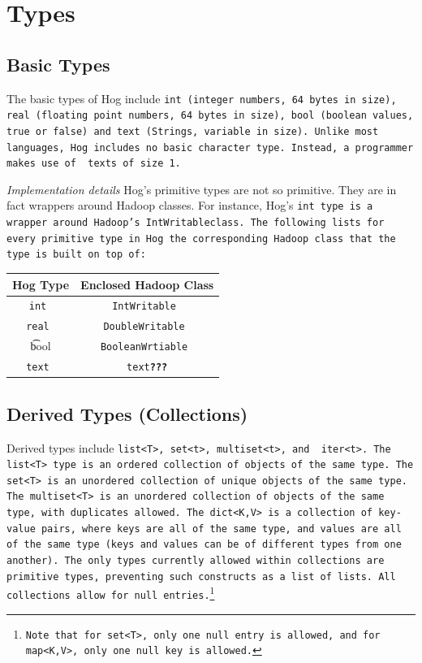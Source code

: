 \documentclass{article}
\begin{document}

\section{Types} %
\label{sec:types}

\subsection{Basic Types} %
\label{sub:basic_types}

The basic types of Hog include \tt int \rm (integer numbers, 64 bytes in size), \tt
real \rm (floating point numbers, 64 bytes in size), \tt bool \rm(boolean values,
true or false) and \tt text \rm (Strings, variable in size). Unlike most languages,
Hog includes no basic character type. Instead, a programmer makes use of \tt
text\rm s of size 1.

\emph{Implementation details} Hog’s primitive types are not so primitive. They are
in fact wrappers around Hadoop classes. For instance, Hog’s \tt int \rm type is a
wrapper around Hadoop's \tt IntWritableclass\rm. The following lists for every
primitive type in Hog the corresponding Hadoop class that the type is built on top
of:

\begin{center}
\begin{tabular}{|c|c|}
    \hline
\textbf{Hog Type} & \textbf{Enclosed Hadoop Class} \\ \hline
\tt int & \tt IntWritable \\ \hline
\tt real & \tt DoubleWritable \\ \hline
\t bool & \tt BooleanWrtiable \\ \hline
\tt text & \tt text\textbf{???}\rm \\ \hline
\end{tabular}
\end{center}


\subsection{Derived Types (Collections)} %
\label{sub:derived_types_collections_}

Derived types include \tt list<T>\rm, \tt set<t>\rm, \tt multiset<t>\rm, and \tt
iter<t>\rm. The \tt list<T> \rm type is an ordered collection of objects of the
same type. The \tt set<T> \rm is an unordered collection of unique objects of the
same type. The \tt multiset<T> \rm is an unordered collection of objects of the
same type, with duplicates allowed. The \tt dict<K,V> \rm is a collection of
key­value pairs, where keys are all of the same type, and values are all of the
same type (keys and values can be of different types from one another). The only
types currently allowed within collections are primitive types, preventing such
constructs as a list of lists. All collections allow for null
entries.\footnote{Note that for \tt set<T>\rm, only one \tt null \rm entry is
allowed, and for \tt map<K,V>\rm, only one \tt null \rm key is allowed.}
\end{document}
